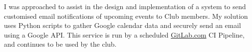\descript{ }
\vspace*{-\topsep}  %
\begin{justify}
I was approached to assist in the design and implementation of a system to send customised email notifications of upcoming events to Club members.
My solution uses Python scripts to gather Google calendar data and securely send an email using a Google API.
This service is run by a scheduled \href{https://gitlab.com/}{GitLab.com} CI Pipeline, and continues to be used by the club.
\end{justify}
